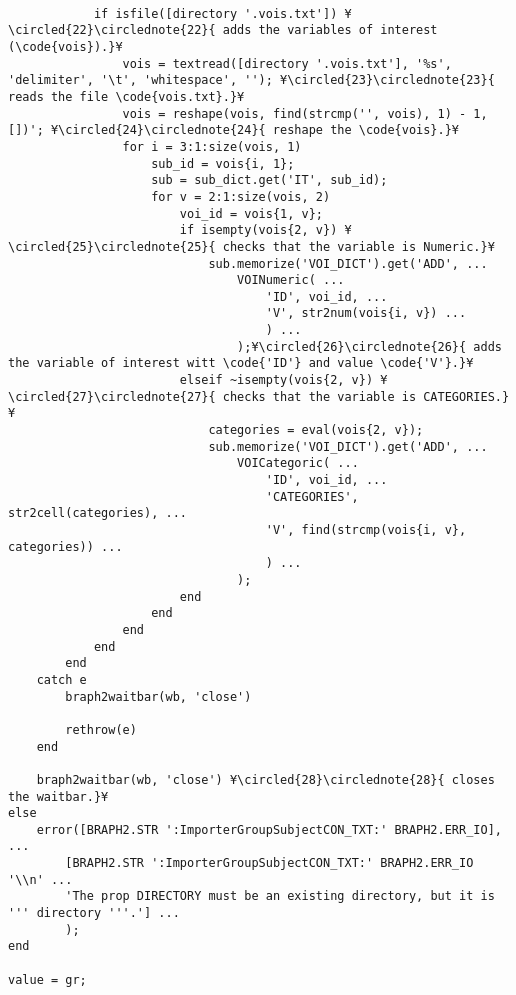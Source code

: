 \documentclass{tufte-handout}
\begin{document}
\begin{lstlisting}
            
            if isfile([directory '.vois.txt']) ¥\circled{22}\circlednote{22}{ adds the variables of interest (\code{vois}).}¥
                vois = textread([directory '.vois.txt'], '%s', 'delimiter', '\t', 'whitespace', ''); ¥\circled{23}\circlednote{23}{ reads the file \code{vois.txt}.}¥
                vois = reshape(vois, find(strcmp('', vois), 1) - 1, [])'; ¥\circled{24}\circlednote{24}{ reshape the \code{vois}.}¥
                for i = 3:1:size(vois, 1)
                    sub_id = vois{i, 1};
                    sub = sub_dict.get('IT', sub_id);
                    for v = 2:1:size(vois, 2)
                        voi_id = vois{1, v};
                        if isempty(vois{2, v}) ¥\circled{25}\circlednote{25}{ checks that the variable is Numeric.}¥
                            sub.memorize('VOI_DICT').get('ADD', ...
                                VOINumeric( ...
                                    'ID', voi_id, ...
                                    'V', str2num(vois{i, v}) ...
                                    ) ...
                                );¥\circled{26}\circlednote{26}{ adds the variable of interest witt \code{'ID'} and value \code{'V'}.}¥
                        elseif ~isempty(vois{2, v}) ¥\circled{27}\circlednote{27}{ checks that the variable is CATEGORIES.}¥
                            categories = eval(vois{2, v});
                            sub.memorize('VOI_DICT').get('ADD', ...
                                VOICategoric( ...
                                    'ID', voi_id, ...
                                    'CATEGORIES', str2cell(categories), ...
                                    'V', find(strcmp(vois{i, v}, categories)) ...
                                    ) ...
                                );
                        end                        
                    end
                end
            end
        end
    catch e
        braph2waitbar(wb, 'close')
        
        rethrow(e)
    end
    
	braph2waitbar(wb, 'close') ¥\circled{28}\circlednote{28}{ closes the waitbar.}¥
else
    error([BRAPH2.STR ':ImporterGroupSubjectCON_TXT:' BRAPH2.ERR_IO], ...
        [BRAPH2.STR ':ImporterGroupSubjectCON_TXT:' BRAPH2.ERR_IO '\\n' ...
        'The prop DIRECTORY must be an existing directory, but it is ''' directory '''.'] ...
        );
end

value = gr;
\end{lstlisting}
\clearpage
\end{document}
